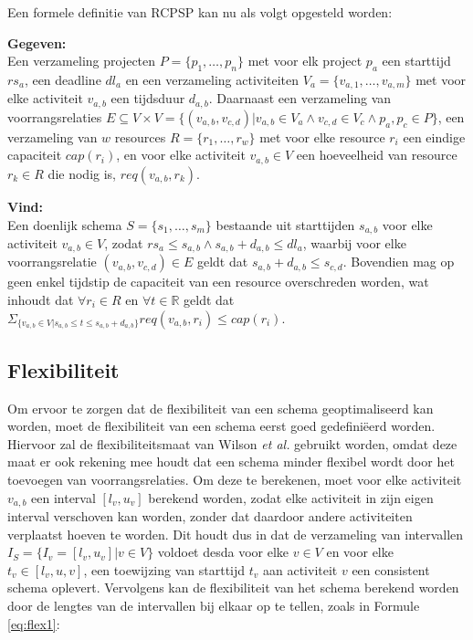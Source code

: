 Een formele definitie van RCPSP kan nu als volgt opgesteld worden:

\textbf{Gegeven:}\\
Een verzameling projecten $P = \{p_1, \dots ,p_n\}$ met voor elk project $p_a$ een starttijd $rs_a$, een deadline $dl_a$ en een verzameling activiteiten $V_a = \{v_{a,1},\dots ,v_{a,m}\}$ met voor elke activiteit $v_{a,b}$ een tijdsduur $d_{a,b}$. Daarnaast een verzameling van voorrangsrelaties $E \subseteq V \times V = \{(v_{a,b},v_{c,d}) | v_{a,b} \in V_a \wedge v_{c,d} \in V_c \wedge p_a,p_c \in P \}$, een verzameling van $w$ resources $R = \{r_1, \dots ,r_w\}$ met voor elke resource $r_i$ een eindige capaciteit $cap(r_i)$, en voor elke activiteit $v_{a,b} \in V$ een hoeveelheid van resource $r_k \in R$ die nodig is, $req(v_{a,b},r_k)$.

\textbf{Vind:}\\
Een doenlijk schema $S = \{s_1,\dots ,s_m\}$ bestaande uit starttijden $s_{a,b}$ voor elke activiteit $v_{a,b} \in V$, zodat $rs_a \leq s_{a,b} \wedge s_{a,b} + d_{a,b} \leq dl_a$, waarbij voor elke voorrangsrelatie $(v_{a,b},v_{c,d}) \in E$ geldt dat $s_{a,b} + d_{a,b} \leq s_{c,d}$. Bovendien mag op geen enkel tijdstip de capaciteit van een resource overschreden worden, wat inhoudt dat $\forall r_i \in R$ en $\forall t \in \mathbb{R}$ geldt dat $\Sigma _{\{v_{a,b} \in V | s_{a,b} \leq t \leq s_{a,b} + d_{a,b}\}} req(v_{a,b},r_i) \leq cap(r_i)$.

\subsection{Flexibiliteit}
\label{subsec:flexprobleem}
Om ervoor te zorgen dat de flexibiliteit van een schema geoptimaliseerd kan worden, moet de flexibiliteit van een schema eerst goed gedefini\"eerd worden. Hiervoor zal de flexibiliteitsmaat van Wilson \emph{et al.} \cite{wilson2013flexibility} gebruikt worden, omdat deze maat er ook rekening mee houdt dat een schema minder flexibel wordt door het toevoegen van voorrangsrelaties. Om deze te berekenen, moet voor elke activiteit $v_{a,b}$ een interval $[l_v,u_v]$ berekend worden, zodat elke activiteit in zijn eigen interval verschoven kan worden, zonder dat daardoor andere activiteiten verplaatst hoeven te worden. Dit houdt dus in dat de verzameling van intervallen $I_S = \{I_v = [l_v,u_v] | v \in V\}$ voldoet desda voor elke $v \in V$ en voor elke $t_v \in [l_v,u,v]$, een toewijzing van starttijd $t_v$ aan activiteit $v$ een consistent schema oplevert. Vervolgens kan de flexibiliteit van het schema berekend worden door de lengtes van de intervallen bij elkaar op te tellen, zoals in Formule \ref{eq:flex1}:

